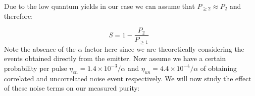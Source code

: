 \documentclass[reprint,onecolumn]{revtex4-1}
\begin{document}
Due to the low quantum yields in our case we can assume that $P_{\ge2}\approx P_{2}$ and
therefore:

\begin{equation*}
S=1-\frac{P_{2}}{P_{\ge1}}
\end{equation*}
Note the absence of the $\alpha$ factor here since we are theoretically
considering the events obtained directly from the emitter. Now assume
we have a certain probability per pulse $\eta_{cn}=1.4\times10^{-3}/\alpha$ and $\eta_{un}=4.4\times10^{-4}/\alpha$
of obtaining correlated and uncorrelated noise event respectively. 
We will now study the effect of these noise terms on our measured purity:

\end{document}
